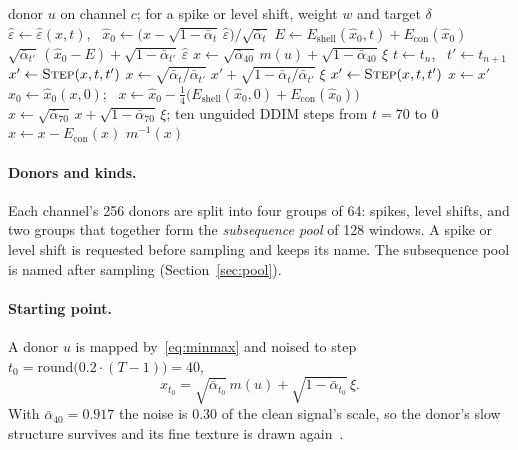 \documentclass[11pt,a4paper]{article}
\newcommand{\xhat}{\hat{x}_{0}}            %
\newcommand{\ehat}{\hat{\varepsilon}}      %
\newcommand{\abar}{\bar\alpha}
\newcommand{\Eshell}{E_{\mathrm{shell}}}
\newcommand{\Econ}{E_{\mathrm{con}}}
\begin{document}
\begin{algorithm}[t]
\caption{GenFSDiff, one steered window. $\xi$ is fresh standard normal noise
at each use, $\ehat$ the blended prediction~\eqref{eq:flip}, and $\xhat$
follows from~\eqref{eq:x0hat}. $\Econ$ is zero on the subsequence pool.}
\label{alg:chain}
\begin{algorithmic}[1]
\Require donor $u$ on channel $c$; for a spike or level shift, weight $w$ and
  target $\delta$
  \State $\ehat \gets \ehat(x, t)$, \ $\xhat \gets \bigl(x - \sqrt{1 - \abar_{t}}\,\ehat\bigr) / \sqrt{\abar_{t}}$
  \State $E \gets \Eshell(\xhat, t) + \Econ(\xhat)$
  \State \Return $\sqrt{\abar_{t'}}\,(\xhat - E) + \sqrt{1 - \abar_{t'}}\,\ehat$
\EndFunction
\Statex
\State $x \gets \sqrt{\abar_{40}}\, m(u) + \sqrt{1 - \abar_{40}}\,\xi$
  \State $t \gets t_{n}$, \ $t' \gets t_{n+1}$
  \State $x' \gets \Call{Step}{x, t, t'}$
    \State $x \gets \sqrt{\abar_{t}/\abar_{t'}}\;x' + \sqrt{1 - \abar_{t}/\abar_{t'}}\;\xi$
    \State $x' \gets \Call{Step}{x, t, t'}$
  \EndIf
  \State $x \gets x'$
\EndFor
\State $\xhat \gets \xhat(x, 0)$; \ $x \gets \xhat - \tfrac{1}{4}\bigl(\Eshell(\xhat, 0) + \Econ(\xhat)\bigr)$
  \State $x \gets \sqrt{\abar_{70}}\,x + \sqrt{1 - \abar_{70}}\,\xi$; ten unguided DDIM steps from $t = 70$ to $0$
  \State $x \gets x - \Econ(x)$ 
\EndIf
\State \Return $m^{-1}(x)$
\end{algorithmic}
\end{algorithm}

\paragraph{Donors and kinds.}
Each channel's 256 donors are split into four groups of 64: spikes, level
shifts, and two groups that together form the \emph{subsequence pool} of 128
windows. A spike or level shift is requested before sampling and keeps its
name. The subsequence pool is named after sampling (Section~\ref{sec:pool}).

\paragraph{Starting point.}
A donor $u$ is mapped by~\eqref{eq:minmax} and noised to step
$t_{0} = \mathrm{round}\bigl(0.2 \cdot (T - 1)\bigr) = 40$,
\begin{equation}
\label{eq:t0}
x_{t_{0}} = \sqrt{\abar_{t_{0}}}\, m(u) + \sqrt{1 - \abar_{t_{0}}}\,\xi .
\end{equation}
With $\abar_{40} = 0.917$ the noise is 0.30 of the clean signal's scale, so
the donor's slow structure survives and its fine texture is drawn
again~\cite{meng2022sdedit}.
\end{document}
